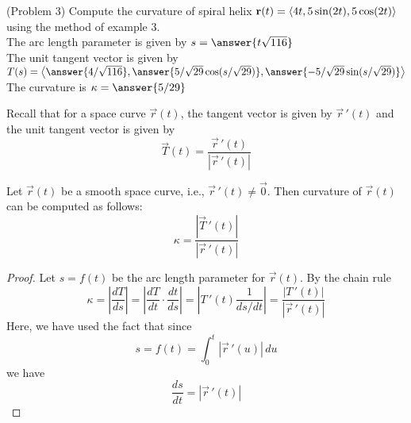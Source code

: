\documentclass[handout]{ximera}
\begin{document}
\begin{problem}(Problem 3)
Compute the curvature of spiral helix $\mathbf r(t) = \left\langle 4t, 5 \sin(2t),5\cos(2t)\right\rangle$ using the method of example 3.\\
The arc length parameter is given by $s = \answer{t\sqrt{116}}$\\
The unit tangent vector is given by $T(s) = \vector{\answer{4/\sqrt{116}}, \answer{5/\sqrt{29} \cos(s/\sqrt{29})}, \answer{-5/\sqrt{29} \sin(s/\sqrt{29})}}$\\
The curvature is $\kappa = \answer{5/29}$
\end{problem}

Recall that for a space curve $\vec r(t)$, the tangent vector is given by $\vec r\,'(t)$ and the unit tangent vector is given by
\[
\vec T(t) = \frac{\vec r\,'(t)}{|\vec r\,'(t)|}
\]

\begin{proposition}
Let $\vec r(t)$ be a smooth space curve, i.e., $\vec r\,'(t) \neq \vec 0$. Then curvature of $\vec r(t)$ can be computed as follows:
\[
\kappa = \frac{|\vec T\,'(t)|}{|\vec r\,'(t)|}
\]
\end{proposition}
\begin{proof}
Let $s = f(t)$ be the arc length parameter for $\vec r(t)$. By the chain rule
\[
\kappa = \left|\frac{dT}{ds}\right| = \left|\frac{dT}{dt} \cdot \frac{dt}{ds}\right| = \left|T\,'(t) \frac{1}{ds/dt}\right| = \frac{|T\,'(t)|}{|\vec r\,'(t)|}
\]
Here, we have used the fact that since
\[
s = f(t) = \int_0^t |\vec r\,'(u)| \, du
\]
we have
\[
\frac{ds}{dt} = |\vec r\,'(t)|
\]
\end{proof}
\end{document}
